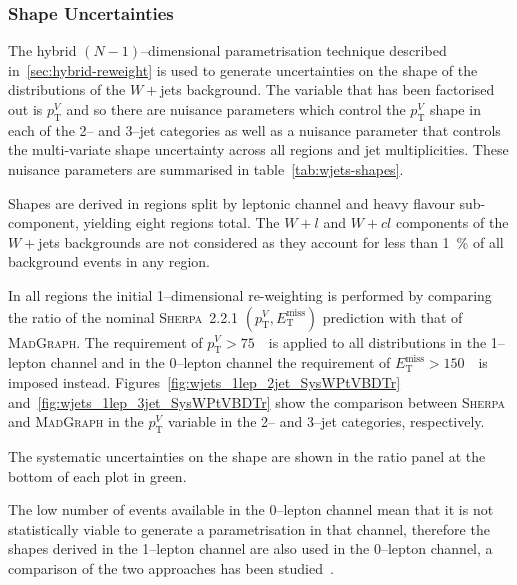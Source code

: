\subsubsection{Shape Uncertainties}

The hybrid $(N-1)$--dimensional parametrisation technique described
in~\ref{sec:hybrid-reweight} is used to generate uncertainties on the shape of
the distributions of the $W+$jets background. The variable that has been
factorised out is $p_{\mathrm{T}}^V$ and so there are nuisance parameters which control the
$p_{\mathrm{T}}^V$ shape in each of the 2-- and 3--jet categories as well as a nuisance
parameter that controls the multi-variate shape uncertainty across all regions
and jet multiplicities. These nuisance parameters are summarised in
table~\ref{tab:wjets-shapes}.


Shapes are derived in regions split by leptonic channel and heavy flavour
sub-component, yielding eight regions total. The $W+l$ and $W+cl$ components of
the $W+$jets backgrounds are not considered as they account for less than 1~\%
of all background events in any region.

In all regions the initial 1--dimensional re-weighting is performed by comparing
the ratio of the nominal \textsc{Sherpa}~2.2.1 $(p_{\mathrm{T}}^V,
E_{\mathrm{T}}^{\text{miss}})$ prediction with that of \textsc{MadGraph}. The
requirement of $p_{\mathrm{T}}^V>75$~\GeV\ is applied to all distributions in
the 1--lepton channel and in the 0--lepton channel the requirement of
$E_{\mathrm{T}}^{\text{miss}}>150$~\GeV\ is imposed instead.
Figures~\ref{fig:wjets_1lep_2jet_SysWPtVBDTr}
and~\ref{fig:wjets_1lep_3jet_SysWPtVBDTr} show the comparison between
\textsc{Sherpa} and \textsc{MadGraph} in the  $p_{\mathrm{T}}^V$ variable in the
2-- and 3--jet categories, respectively.

The systematic uncertainties on the shape are shown in the ratio panel at the
bottom of each plot in green.

The low number of events available in the 0--lepton channel mean that it is not
statistically viable to generate a parametrisation in that channel, therefore
the shapes derived in the 1--lepton channel are also used in the 0--lepton
channel, a comparison of the two approaches has been
studied~\cite{VHModellingNote2019}.

